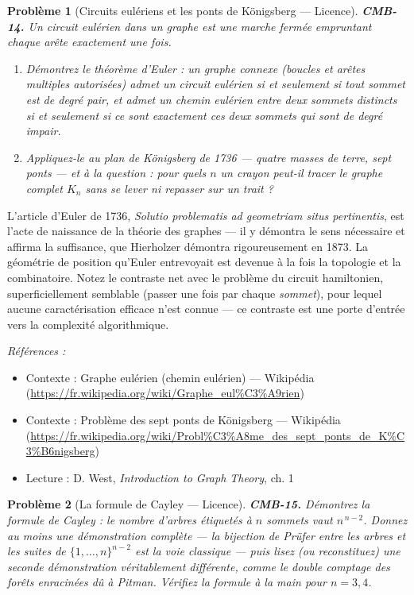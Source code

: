 \documentclass[11pt]{article}
\newtheorem{problem}{Problème}
\newenvironment{refs}{\par\small\noindent\emph{Références :}\begin{itemize}\setlength\itemsep{0pt}}{\end{itemize}\normalsize}
\begin{document}
\begin{problem}[{Circuits eulériens et les ponts de Königsberg --- Licence}]
\textbf{CMB-14.} Un circuit eulérien dans un graphe est une marche fermée empruntant chaque
arête exactement une fois.
\begin{enumerate}
\item[(a)] Démontrez le théorème d'Euler : un graphe connexe (boucles et arêtes multiples autorisées)
admet un circuit eulérien si et seulement si tout sommet est de degré pair, et admet un chemin
eulérien entre deux sommets distincts si et seulement si ce sont exactement ces deux sommets qui
sont de degré impair.
\item[(b)] Appliquez-le au plan de Königsberg de 1736 --- quatre masses de terre, sept ponts --- et à la
question : pour quels $ n $ un crayon peut-il tracer le graphe complet $ K_n $ sans se lever
ni repasser sur un trait ?
\end{enumerate}

\end{problem}

\noindent L'article d'Euler de 1736, \textit{Solutio problematis ad geometriam situs
pertinentis}, est l'acte de naissance de la théorie des graphes --- il y démontra le sens
nécessaire et affirma la suffisance, que Hierholzer démontra rigoureusement en 1873. La
\og{} géométrie de position \fg{} qu'Euler entrevoyait est devenue à la fois la topologie et la
combinatoire. Notez le contraste net avec le problème du circuit hamiltonien, superficiellement
semblable (passer une fois par chaque \textit{sommet}), pour lequel aucune caractérisation efficace
n'est connue --- ce contraste est une porte d'entrée vers la complexité algorithmique.

\begin{refs}
\item Contexte : Graphe eulérien (chemin eulérien) --- Wikipédia (\url{https://fr.wikipedia.org/wiki/Graphe_eul%C3%A9rien})
\item Contexte : Problème des sept ponts de Königsberg --- Wikipédia (\url{https://fr.wikipedia.org/wiki/Probl%C3%A8me_des_sept_ponts_de_K%C3%B6nigsberg})
\item Lecture : D. West, \textit{Introduction to Graph Theory}, ch. 1
\end{refs}

\bigskip

\begin{problem}[{La formule de Cayley --- Licence}]
\textbf{CMB-15.} Démontrez la formule de Cayley : le nombre d'arbres
étiquetés à $ n $ sommets vaut $ n^{\,n-2} $. Donnez au moins une démonstration complète --- la
bijection de Prüfer entre les arbres et les suites de $ \{1,\dots,n\}^{n-2} $ est la voie
classique --- puis lisez (ou reconstituez) une seconde démonstration véritablement différente,
comme le double comptage des forêts enracinées dû à Pitman. Vérifiez la formule à la main pour
$ n = 3, 4 $.
\end{problem}
\end{document}
